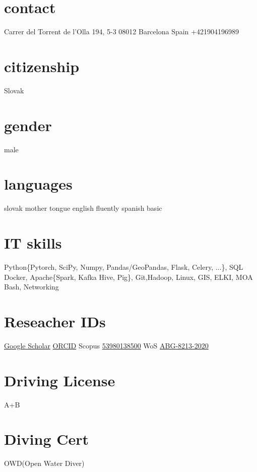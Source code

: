 \documentclass[]{friggeri-cv} %
\begin{document}

\begin{aside} %
\section{contact}
Carrer del Torrent 
de l'Olla 194, 5-3
08012 Barcelona
Spain
+421904196989 \faMobilePhone
\section{citizenship}
Slovak
\section{gender}
male
\section{languages}
slovak mother tongue
english fluently
spanish basic
\section{IT skills}
{\color{red} \faHeart}Python\{Pytorch, SciPy, Numpy, Pandas/GeoPandas, Flask, Celery, ...\}, SQL
Docker,
Apache\{Spark, Kafka
Hive, Pig\}, 
Git,Hadoop, Linux, 
GIS, ELKI, MOA
Bash, Networking
\section{Reseacher IDs}
\href{https://scholar.google.com/citations?user=zsJ4nfoAAAAJ&amp;hl=en}{Google Scholar}
\href{https://orcid.org/0000-0002-9394-8794}{ORCID}
Scopus \href{https://orcid.org/0000-0002-9394-8794}{53980138500}
WoS \href{https://publons.com/researcher/4094849/pavol-mulinka/}{ABG-8213-2020}
\section{Driving License}
A+B
\section{Diving Cert}
OWD(Open Water Diver)
\end{aside}
\end{document}
